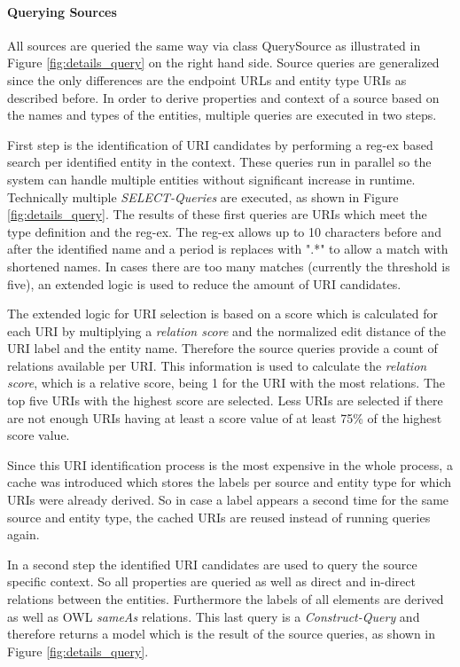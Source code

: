 \paragraph{Querying Sources}
All sources are queried the same way via class QuerySource as illustrated in Figure \ref{fig:details_query} on the right hand side. Source queries are generalized since the only differences are the endpoint URLs and entity type URIs as described before. In order to derive properties and context of a source based on the names and types of the entities, multiple queries are executed in two steps.

First step is the identification of URI candidates by performing a reg-ex based search per identified entity in the context. These queries run in parallel so the system can handle multiple entities without significant increase in runtime. Technically multiple \textit{SELECT-Queries} are executed, as shown in Figure \ref{fig:details_query}. The results of these first queries are URIs which meet the type definition and the reg-ex. The reg-ex allows up to 10 characters before and after the identified name and a period is replaces with ".*" to allow a match with shortened names. In cases there are too many matches (currently the threshold is five), an extended logic is used to reduce the amount of URI candidates. 

The extended logic for URI selection is based on a score which is calculated for each URI by multiplying a \textit{relation score} and the normalized edit distance of the URI label and the entity name. Therefore the source queries provide a count of relations available per URI. This information is used to calculate the \textit{relation score}, which is a relative score, being 1 for the URI with the most relations. The top five URIs with the highest score are selected. Less URIs are selected if there are not enough URIs having at least a score value of at least 75\% of the highest score value.

Since this URI identification process is the most expensive in the whole process, a cache was introduced which stores  the labels per source and entity type for which URIs were already derived. So in case a label appears a second time for the same source and entity type, the cached URIs are reused instead of running queries again.

In a second step the identified URI candidates are used to query the source specific context. So all properties are queried as well as direct and in-direct relations between the entities. Furthermore the labels of all elements are derived as well as OWL \textit{sameAs} relations. 
This last query is a \textit{Construct-Query} and therefore returns a model which is the result of the source queries, as shown in Figure \ref{fig:details_query}. 

